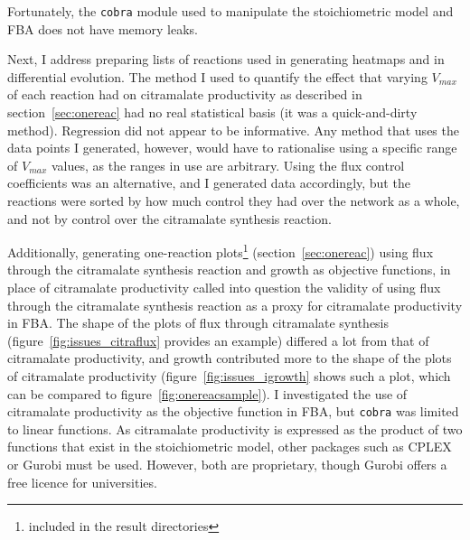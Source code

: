 \documentclass[parskip=full, numbers=noenddot]{scrreprt}
\begin{document}
Fortunately, the \texttt{cobra} module used to manipulate the stoichiometric model and FBA does not have memory leaks.

Next, I address preparing lists of reactions used in generating heatmaps and in differential evolution. The method I used to quantify the effect that varying $V_{max}$ of each reaction had on citramalate productivity as described in section~\ref{sec:onereac} had no real statistical basis (it was a quick-and-dirty method). Regression did not appear to be informative. Any method that uses the data points I generated, however, would have to rationalise using a specific range of $V_{max}$ values, as the ranges in use are arbitrary. Using the flux control coefficients was an alternative, and I generated data accordingly, but the reactions were sorted by how much control they had over the network as a whole, and not by control over the citramalate synthesis reaction.

Additionally, generating one-reaction plots\footnote{included in the result directories} (section~\ref{sec:onereac}) using flux through the citramalate synthesis reaction and growth as objective functions, in place of citramalate productivity called into question the validity of using flux through the citramalate synthesis reaction as a proxy for citramalate productivity in FBA. The shape of the plots of flux through citramalate synthesis (figure~\vref{fig:issues_citraflux} provides an example) differed a lot from that of citramalate productivity, and growth contributed more to the shape of the plots of citramalate productivity (figure~\vref{fig:issues_igrowth} shows such a plot, which can be compared to figure~\vref{fig:onereacsample}). I investigated the use of citramalate productivity as the objective function in FBA, but \texttt{cobra} was limited to linear functions. As citramalate productivity is expressed as the product of two functions that exist in the stoichiometric model, other packages such as CPLEX or Gurobi must be used. However, both are proprietary, though Gurobi offers a free licence for universities.
\end{document}
